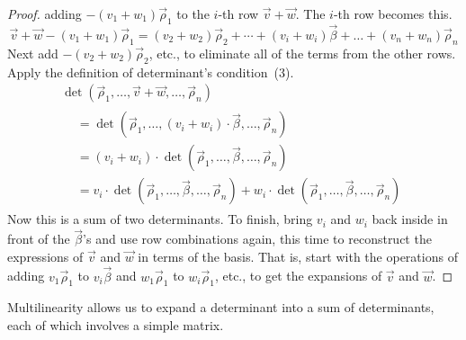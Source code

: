 \begin{proof}
adding $-(v_1+w_1)\vec{\rho}_1$ to the $i$-th row $\vec{v}+\vec{w}$.
The $i$-th row becomes this.
\begin{equation*}
  \vec{v}+\vec{w}-(v_1+w_1)\vec{\rho}_1
  =
  (v_2+w_2)\vec{\rho}_2+\cdots+(v_i+w_i)\vec{\beta}
            +\dots+(v_n+w_n)\vec{\rho}_n 
\end{equation*}
Next add $-(v_2+w_2)\vec{\rho}_2$, etc., to eliminate 
all of the terms from the other rows.
Apply the definition of determinant's condition~(3).
\begin{multline*}
  \det (\vec{\rho}_1,\dots,\vec{v}+\vec{w},\dots,\vec{\rho}_n)          \\
  \begin{aligned}
    &=\det (\vec{\rho}_1,\dots,(v_i+w_i)\cdot\vec{\beta},\dots,\vec{\rho}_n) \\
    &=(v_i+w_i)\cdot\det (\vec{\rho}_1,\dots,\vec{\beta},\dots,\vec{\rho}_n) \\
    &=v_i\cdot \det (\vec{\rho}_1,\dots,\vec{\beta},\dots,\vec{\rho}_n)  
     +w_i\cdot \det (\vec{\rho}_1,\dots,\vec{\beta},\dots,\vec{\rho}_n)
  \end{aligned}
\end{multline*}
Now this is a sum of two determinants.
To finish, bring $v_i$ and $w_i$ back inside in front of the 
$\vec{\beta}$'s
and use row combinations again, 
this time to reconstruct the expressions of $\vec{v}$
and $\vec{w}$ in terms of the basis.
That is, start with the operations
of adding $v_1\vec{\rho}_1$ to $v_i\vec{\beta}$ 
and $w_1\vec{\rho}_1$ to $w_i\vec{\rho}_1$, etc.,
to get the expansions of $\vec{v}$ and $\vec{w}$.
\end{proof}

Multilinearity allows us to expand a determinant into a sum of
determinants, each of which involves a simple matrix.

